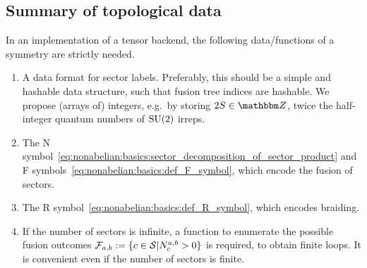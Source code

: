 
\subsection{Summary of topological data}
\label{subsec:nonabelian:topo_data:summary}

In an implementation of a tensor backend, the following data/functions of a symmetry are strictly needed.
\begin{enumerate}[label=(\roman*)]
    \item \label{item:nonabelian:topo_data:summary:necessary_first}
    A data format for sector labels. Preferably, this should be a simple and hashable data structure, such that fusion tree indices are hashable. We propose (arrays of) integers, e.g.~by storing $2S \in\Zbb$, twice the half-integer quantum numbers of $\mathrm{SU}(2)$ irreps.
    \item The N symbol~\eqref{eq:nonabelian:basics:sector_decomposition_of_sector_product} and F symbols~\eqref{eq:nonabelian:basics:def_F_symbol}, which encode the fusion of sectors.
    \item The R symbol~\eqref{eq:nonabelian:basics:def_R_symbol}, which encodes braiding.
    \item \label{item:nonabelian:topo_data:summary:necessary_last}
    If the number of sectors is infinite, a function to enumerate the possible fusion outcomes $\mathcal{F}_{a,b} := \setdef{c \in \mathcal{S}}{N^{a,b}_{c} > 0}$ is required, to obtain finite loops. It is convenient even if the number of sectors is finite.
\end{enumerate}

